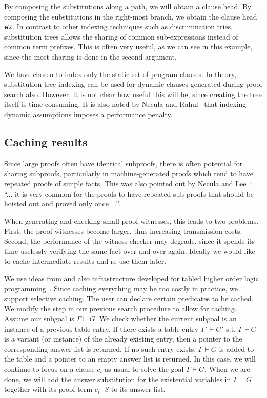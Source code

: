 \documentclass{llncs}
\newcommand{\eqirLF}{\tt{e2}}
\newcommand{\vd}{\vdash}
\begin{document}
By composing the substitutions along a path, we will obtain a clause
head. By composing the substitutions in the right-most branch, we
obtain the clause head $\eqirLF$.  In contrast to other indexing
techniques such as discrimination tries, substitution trees allows the
sharing of common sub-expressions instead of common term
prefixes. This is often very useful, as we can see in this example,
since the most sharing is done in the second argument.

We have chosen to index only the static set of program clauses. In
theory, substitution tree indexing can be used for dynamic clauses
generated during proof search also.  However, it is not clear how
useful this will be, since creating the tree itself is
time-consuming. It is also noted by Necula and
Rahul~\cite{Necula+01:oracle} that indexing dynamic assumptions
imposes a performance penalty.

\subsection{Caching results}
\label{sec:tabling}
Since large proofs often have identical subproofs, there is often
potential for sharing subproofs, particularly in machine-generated
proofs which tend to have repeated proofs of simple facts. This was
also pointed out by Necula and Lee~\cite{NeculaLee+97:resource}:
``... it is very common for the proofs to have  
repeated sub-proofs that should be hoisted out and 
proved only once ...''.

When generating and checking small proof witnesses, this leads to two
problems.  First, the proof witnesses become larger, thus increasing
transmission costs. Second, the performance of the witness checker may
degrade, since it spends its time uselessly verifying the same fact
over and over again. Ideally we would like to cache intermediate
results and re-use them later. 

We use ideas from and also infrastructure developed for tabled higher
order logic programming~\cite{Pientka03phd,Pientka:ICLP02}.  Since
caching everything may be too costly in practice, we support selective
caching. The user can declare certain predicates to be cached. We
modify the {} step in our previous search procedure to
allow for caching.
Assume our subgoal is $\Gamma \vd G$. We check whether the
current subgoal is an instance of a previous table entry. If there
exists a table entry $\Gamma' \vd G'$ s.t. $\Gamma \vd G$ is a variant
(or instance) of the already existing entry, then a pointer to the
corresponding answer list is returned. If no such entry exists,
$\Gamma \vd G$ is added to the table and a pointer to an empty answer
list is returned. In this case, we will continue to focus on a clause
$c_i$ as usual to solve the goal $\Gamma \vd G$. When we are done, we
will add the answer substitution for the existential variables in
$\Gamma \vd G$ together with its proof term $c_i \cdot S$ to its
answer list.
\end{document}
